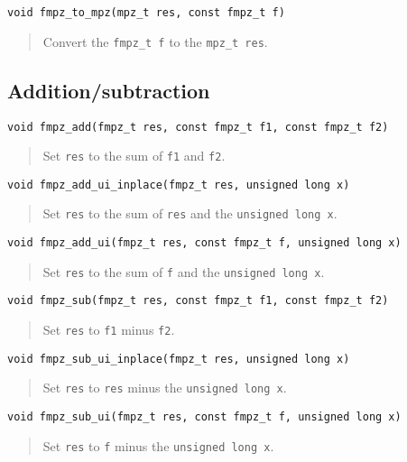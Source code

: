 \documentclass[a4paper,10pt]{article}
\newcommand{\code}{\lstinline}
\begin{document}
\begin{lstlisting}
void fmpz_to_mpz(mpz_t res, const fmpz_t f)
\end{lstlisting}
\begin{quote}
Convert the \code{fmpz_t f} to the \code{mpz_t res}. 
\end{quote}

\subsection{Addition/subtraction}

\begin{lstlisting}
void fmpz_add(fmpz_t res, const fmpz_t f1, const fmpz_t f2)
\end{lstlisting}
\begin{quote}
Set \code{res} to the sum of \code{f1} and \code{f2}.
\end{quote}

\begin{lstlisting}
void fmpz_add_ui_inplace(fmpz_t res, unsigned long x)
\end{lstlisting}
\begin{quote}
Set \code{res} to the sum of \code{res} and the \code{unsigned long x}.
\end{quote}

\begin{lstlisting}
void fmpz_add_ui(fmpz_t res, const fmpz_t f, unsigned long x)
\end{lstlisting}
\begin{quote}
Set \code{res} to the sum of \code{f} and the \code{unsigned long x}.
\end{quote}

\begin{lstlisting}
void fmpz_sub(fmpz_t res, const fmpz_t f1, const fmpz_t f2)
\end{lstlisting}
\begin{quote}
Set \code{res} to \code{f1} minus \code{f2}.
\end{quote}

\begin{lstlisting}
void fmpz_sub_ui_inplace(fmpz_t res, unsigned long x)
\end{lstlisting}
\begin{quote}
Set \code{res} to \code{res} minus the \code{unsigned long x}.
\end{quote}

\begin{lstlisting}
void fmpz_sub_ui(fmpz_t res, const fmpz_t f, unsigned long x)
\end{lstlisting}
\begin{quote}
Set \code{res} to \code{f} minus the \code{unsigned long x}.
\end{quote}
\end{document}
